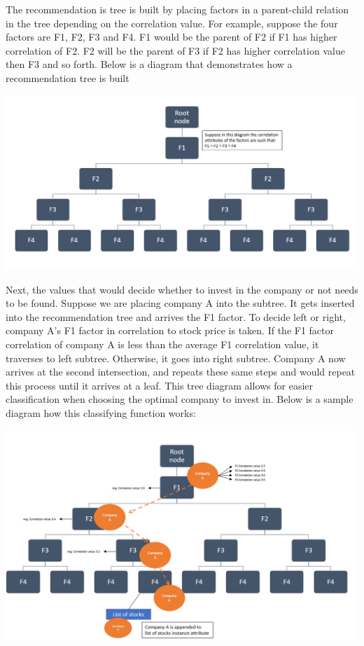 \documentclass[fontsize=11pt]{article}
\begin{document}
The recommendation is tree is built by placing factors in a parent-child relation in the tree depending on the correlation value. For example, suppose the four factors are F1, F2, F3 and F4. F1 would be the parent of F2 if F1 has higher correlation of F2. F2 will be the parent of F3 if F2 has higher correlation value then F3 and so forth. Below is a diagram that demonstrates how a recommendation tree is built\\

\begin{center}
\includegraphics[scale=0.75]{tree_diagram.png}
\end{center}

Next, the values that would decide whether to invest in the company or not needs to be found. Suppose we are placing company A into the subtree. It gets inserted into the recommendation tree and arrives the F1 factor. 
To decide left or right, company A's F1 factor in correlation to stock price is taken. If the F1 factor correlation of company A is less than the average F1 correlation value, it traverses to left subtree. Otherwise, it goes into right subtree. Company A now arrives at the second intersection, and repeats these same steps and would repeat this process until it arrives at a leaf. This tree diagram allows for easier classification when choosing the optimal company to invest in. Below is a sample diagram how this classifying function works:
\begin{center}
\includegraphics[scale=0.75]{tree_traversal.png}
\end{center} 
\end{document}
